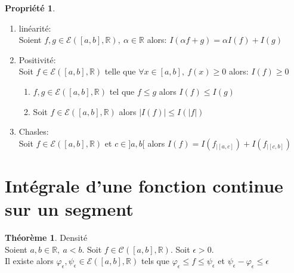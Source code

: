 \documentclass[fleqn]{article}
\theoremstyle{definition} \newtheorem*{defi}{D\'efinition}
\theoremstyle{definition} \newtheorem*{theo}{Th\'eor\`eme}
\theoremstyle{definition} \newtheorem*{coro}{Corollaire}
\theoremstyle{remark} \newtheorem*{rqs}{Remarques}
\theoremstyle{definition} \newtheorem*{prop}{Propri\'et\'e}
\begin{document}
\begin{prop} $ $
	\begin{enumerate}
		\item lin\'earit\'e: \\
			Soient $f,g \in \mathcal{E}([a,b], \mathbb{R}),\ \alpha \in \mathbb{R}$ alors: $I(\alpha f + g) = \alpha I(f) + I(g)$
		\item Positivit\'e: \\
			Soit $f \in \mathcal{E}([a,b], \mathbb{R})$ telle que $\forall x \in [a,b],\ f(x) \geq 0$ alors: $I(f) \geq 0$
			\begin{enumerate}
				\item $f,g \in \mathcal{E}([a,b], \mathbb{R})$ tel que $f \leq g$ alors $I(f) \leq I(g)$
				\item Soit $f \in \mathcal{E}([a,b], \mathbb{R})$ alors $|I(f)| \leq I(|f|)$
			\end{enumerate}
		\item Chasles: \\
			Soit $f \in \mathcal{E}([a,b], \mathbb{R})$ et $c \in ]a,b[$ alors $I(f) = I(f_{|[a,c]}) + I(f_{|[c,b]})$
	\end{enumerate}
\end{prop}

\section{Int\'egrale d'une fonction continue sur un segment}
\begin{theo} Densit\'e \\
	Soient $a,b \in \mathbb{R},\ a < b$. Soit $f \in \mathscr{C}([a,b], \mathbb{R})$. Soit $\epsilon > 0$. \\
	Il existe alors $\varphi_{\epsilon}, \psi_{\epsilon} \in \mathcal{E}([a,b], \mathbb{R})$ tels que $\varphi_{\epsilon} \leq f
	\leq \psi_{\epsilon}$ et $\psi_{\epsilon} - \varphi_{\epsilon} \leq \epsilon$
\end{theo}
\end{document}
